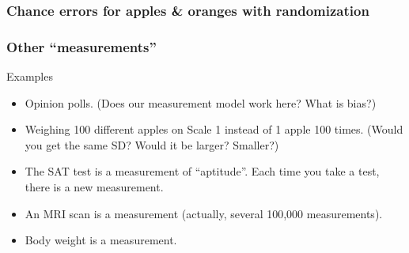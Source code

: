 \documentclass[handout]{beamer}
\begin{document}


   \begin{frame}
   \frametitle{Chance errors for apples \& oranges with randomization}
   \begin{center}
   \end{center}

   \end{frame}


   \begin{frame} \frametitle{Other ``measurements''}

   \begin{block}
   {Examples}
   \begin{itemize}
   \item Opinion polls. (Does our measurement model work here? What is bias?)

   \item Weighing 100 different apples on Scale 1 instead of 1 apple
   100 times. (Would you get the same SD? Would it be larger? Smaller?)

   \item The SAT test is a measurement of ``aptitude''. Each time
   you take a test, there is a new measurement.

   \item An MRI scan is a measurement (actually, several 100,000 measurements).

   \item Body weight is a measurement.
   \end{itemize}
   \end{block}
   \end{frame}


   \begin{frame} 

   \end{frame}

   
\end{document}
